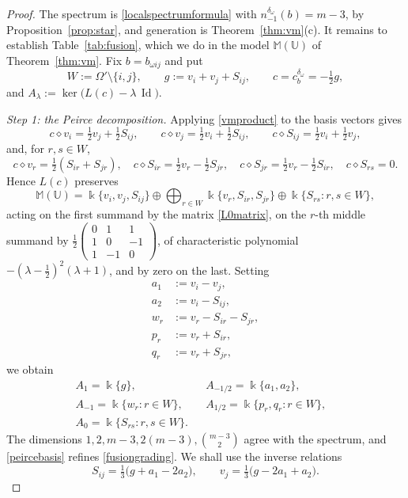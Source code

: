 \documentclass[times,11pt,reqno]{amsproc}
\theoremstyle{definition}
\numberwithin{equation}{section}
\newcommand\fie{\Bbbk}
\def\ualg{\mathbb{U}}
\newcommand{\Id}{\operatorname{Id}}
\def\ualg{\mathbb{U}}
\def\malg{\mathbb{M}}
\newcommand{\vm}[1]{\malg(#1)}
\begin{document}
\begin{proof}

The spectrum is \eqref{localspectrumformula} with
$n^{\delta_\omega}_{-1}(b)=m-3$, by Proposition~\ref{prop:star}, and
generation is Theorem~\ref{thm:vm}(c). It remains to establish
Table~\ref{tab:fusion}, which we do in the model $\vm{\ualg}$ of
Theorem~\ref{thm:vm}. Fix $b=b_{\omega ij}$ and put
\begin{equation}\label{gdef}
W:=\Omega'\setminus\{i,j\},
\qquad
g:=v_i+v_j+S_{ij},
\qquad
c=c^{\delta_\omega}_b=-\tfrac12 g ,
\end{equation}
and $A_\lambda:=\ker\bigl(L(c)-\lambda\,\Id\bigr)$.

\emph{Step 1: the Peirce decomposition.} Applying \eqref{vmproduct} to
the basis vectors gives
$$
c\diamond v_i=\tfrac12 v_j+\tfrac12 S_{ij},
\qquad
c\diamond v_j=\tfrac12 v_i+\tfrac12 S_{ij},
\qquad
c\diamond S_{ij}=\tfrac12 v_i+\tfrac12 v_j,
$$
and, for $r,s\in W$,
$$
c\diamond v_r=\tfrac12(S_{ir}+S_{jr}),
\quad
c\diamond S_{ir}=\tfrac12 v_r-\tfrac12 S_{jr},
\quad
c\diamond S_{jr}=\tfrac12 v_r-\tfrac12 S_{ir},
\quad
c\diamond S_{rs}=0 .
$$
Hence $L(c)$ preserves
\begin{equation}\label{Ldecomp}
\vm{\ualg}
=
\fie\{v_i,v_j,S_{ij}\}
\oplus
\bigoplus_{r\in W}\fie\{v_r,S_{ir},S_{jr}\}
\oplus
\fie\{S_{rs}:r,s\in W\},
\end{equation}
acting on the first summand by the matrix \eqref{L0matrix}, on the
$r$-th middle summand by
$\tfrac12\left(\begin{smallmatrix}0&1&1\\1&0&-1\\1&-1&0\end{smallmatrix}\right)$,
of characteristic polynomial $-(\lambda-\tfrac12)^2(\lambda+1)$, and by
zero on the last. Setting
\begin{equation}\label{apq}
\begin{aligned}
a_1&:=v_i-v_j,\\
a_2&:=v_i-S_{ij},\\
w_r&:=v_r-S_{ir}-S_{jr},\\
p_r&:=v_r+S_{ir},\\
q_r&:=v_r+S_{jr},
\end{aligned}
\end{equation}
we obtain
\begin{equation}\label{peircebasis}
\begin{aligned}
&A_1=\fie\{g\},
&&
A_{-1/2}=\fie\{a_1,a_2\},
&&
\\
&A_{-1}=\fie\{w_r:r\in W\},
&&
A_{1/2}=\fie\{p_r,q_r:r\in W\},\\
&A_0=\fie\{S_{rs}:r,s\in W\}.
\end{aligned}
\end{equation}
The dimensions $1,2,m-3,2(m-3),\binom{m-3}{2}$ agree with the spectrum,
and \eqref{peircebasis} refines \eqref{fusiongrading}. We shall use the
inverse relations
\begin{equation}\label{inverserel}
S_{ij}=\tfrac13\bigl(g+a_1-2a_2\bigr),
\qquad
v_j=\tfrac13\bigl(g-2a_1+a_2\bigr).
\end{equation}


\end{proof}
\end{document}
